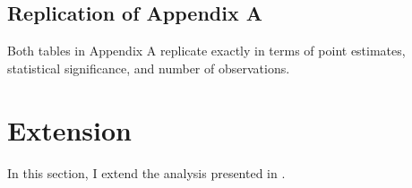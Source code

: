 \documentclass[
  12pt,
]{article}
\begin{document}
\hypertarget{replication-of-appendix-a}{%
\subsection{Replication of Appendix A}\label{replication-of-appendix-a}}

Both tables in Appendix A replicate exactly in terms of point estimates, statistical significance, and number of observations.





\hypertarget{extension}{%
\section{Extension}\label{extension}}

In this section, I extend the analysis presented in \textcite{Frederiksen2022a}.

\printbibliography
\end{document}
